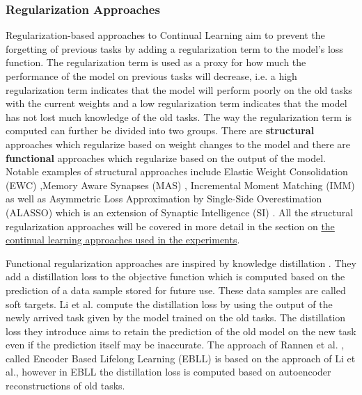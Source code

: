 \subsubsection{Regularization Approaches}
\label{sec:RegularizationApproaches}
Regularization-based approaches to Continual Learning aim to prevent the forgetting of previous tasks by adding a regularization
term to the model's loss function. The regularization term is used as a proxy for how much the performance of the model on previous
tasks will decrease, i.e. a high regularization term indicates that the model will perform poorly on the old tasks with the current
weights and a low regularization term indicates that the model has not lost much knowledge of the old tasks. The way the
regularization term is computed can further be divided into two groups. There are \textbf{structural} approaches which regularize
based on weight changes to the model and there are \textbf{functional} approaches which regularize based on the output of the model.
Notable examples of structural approaches include Elastic Weight Consolidation (EWC) \cite{kirkpatrick2017overcoming},Memory Aware
Synapses (MAS) \cite{aljundi2018memory}, Incremental Moment Matching (IMM) \cite{lee2017overcoming} as well as Asymmetric Loss
Approximation by Single-Side Overestimation (ALASSO) \cite{park2019continual} which is an extension of Synaptic Intelligence (SI)
\cite{zenke2017continual}. All the structural regularization approaches will be covered in more detail in the section on
\hyperref[sec:Related_work:Continual_Learning:Experiments]{the continual learning approaches used in the experiments}. \par
Functional regularization approaches are inspired by knowledge distillation \cite{hinton2015distilling}. They add a distillation
loss to the objective function which is computed based on the prediction of a data sample stored for future use. These data samples
are called soft targets. Li et al. \cite{li2017learning} compute the distillation loss by using the output of the newly arrived task
given by the model trained on the old tasks. The distillation loss they introduce aims to retain the prediction of the old model on
the new task even if the prediction itself may be inaccurate. The approach of Rannen et al. \cite{rannen2017encoder}, called Encoder
Based Lifelong Learning (EBLL) is based on the approach of Li et al., however in EBLL the distillation loss is computed based on
autoencoder reconstructions of old tasks.

